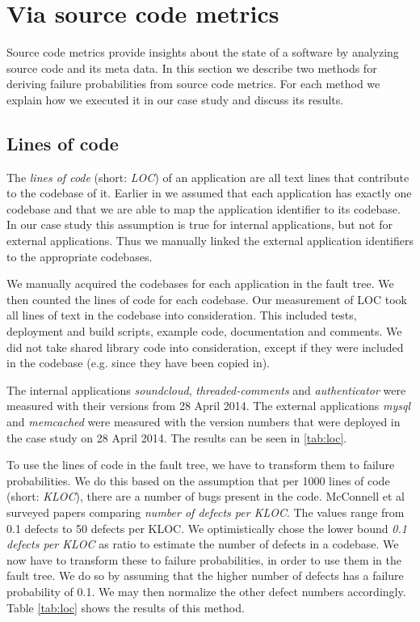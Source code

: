 \section{Via source code metrics}
\label{sec:source_code}

Source code metrics provide insights about the state of a software by analyzing source code and its meta data. In this section we describe two methods for deriving failure probabilities from source code metrics. For each method we explain how we executed it in our case study and discuss its results.

\subsection{Lines of code}
\label{subsec:loc}

The \emph{lines of code} (short: \emph{LOC}) of an application are all text lines that contribute to the codebase of it. Earlier in  we assumed that each application has exactly one codebase and that we are able to map the application identifier to its codebase. In our case study this assumption is true for internal applications, but not for external applications. Thus we manually linked the external application identifiers to the appropriate codebases.

We manually acquired the codebases for each application in the fault tree. We then counted the lines of code for each codebase. Our measurement of LOC took all lines of text in the codebase into consideration. This included tests, deployment and build scripts, example code, documentation and comments. We did not take shared library code into consideration, except if they were included in the codebase (e.g. since they have been copied in).

The internal applications \emph{soundcloud}, \emph{threaded-comments} and \emph{authenticator} were measured with their versions from 28 April 2014. The external applications \emph{mysql} and \emph{memcached} were measured with the version numbers that were deployed in the case study on 28 April 2014. The results can be seen in \autoref{tab:loc}.

To use the lines of code in the fault tree, we have to transform them to failure probabilities. We do this based on the assumption that per 1000 lines of code (short: \emph{KLOC}), there are a number of bugs present in the code. McConnell et al \cite{McConnellSteve} surveyed papers comparing \emph{number of defects per KLOC}. The values range from 0.1 defects to 50 defects per KLOC. We optimistically chose the lower bound \emph{0.1 defects per KLOC} as ratio to estimate the number of defects in a codebase. We now have to transform these to failure probabilities, in order to use them in the fault tree. We do so by assuming that the higher number of defects has a failure probability of 0.1. We may then normalize the other defect numbers accordingly. Table \ref{tab:loc} shows the results of this method.

